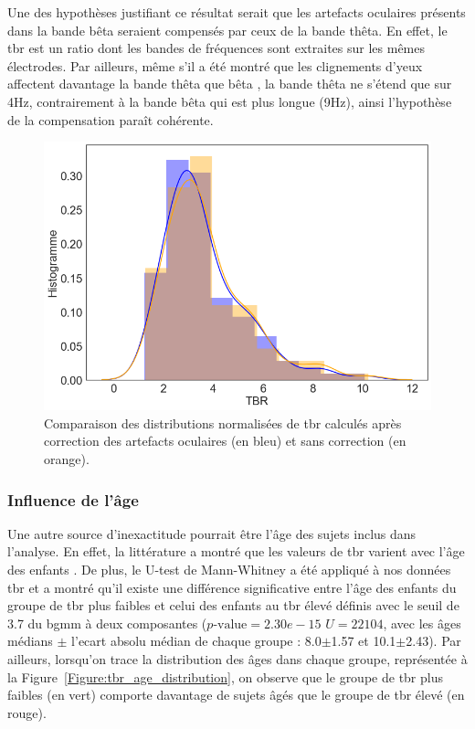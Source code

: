 Une des hypothèses justifiant ce 
résultat serait que les artefacts oculaires présents dans la bande bêta seraient compensés par ceux de la bande thêta. En effet, le \gls{tbr} est un ratio dont les bandes de
fréquences sont extraites sur les mêmes électrodes. Par ailleurs, même s'il a été montré que les clignements d'yeux affectent davantage la bande thêta que bêta \citep{Barthelemy2017},
la bande thêta ne s'étend que sur 4Hz, contrairement à la bande bêta qui est plus longue (9Hz), ainsi l'hypothèse de la compensation paraît cohérente.


\begin{figure}[h!]
  \centering
	\includegraphics[width=0.7\linewidth]{figures/chapter-4/tbr-eye-artifact-correction} 
  \caption[Comparaison des distributions normalisées de \gls{tbr} calculés après correction des artefacts 
	oculaires et sans correction.]{Comparaison des distributions normalisées de \gls{tbr} calculés après correction des artefacts oculaires (en bleu) et sans correction (en orange).}
  \label{Figure:tbr_eye_artifact_correction}
\end{figure}

\subsubsection{Influence de l'âge}

Une autre source d'inexactitude pourrait être l'âge des sujets inclus dans l'analyse. En effet, la littérature a montré que les valeurs de \gls{tbr} varient
avec l'âge des enfants \citep{Liechti2013, Snyder2015, Perone2018}. De plus, le U-test de Mann-Whitney a été appliqué à nos données \gls{tbr} et a montré
qu'il existe une différence significative entre l'âge des enfants du groupe de \gls{tbr} plus faibles et celui des enfants au \gls{tbr} élevé définis avec 
le seuil de 3.7 du \gls{bgmm} à deux composantes
($p\text{-value} = 2.30e-15$\text{,} $U = 22 104$, avec les âges médians $\pm$ l'ecart absolu médian de chaque groupe : 8.0$\pm$1.57 et 10.1$\pm$2.43). Par ailleurs, lorsqu'on trace
la distribution des âges dans chaque groupe, représentée à la Figure~\ref{Figure:tbr_age_distribution}, on observe que le groupe de \gls{tbr} plus faibles (en vert) comporte 
davantage de sujets âgés que le groupe de \gls{tbr} élevé (en rouge). 

